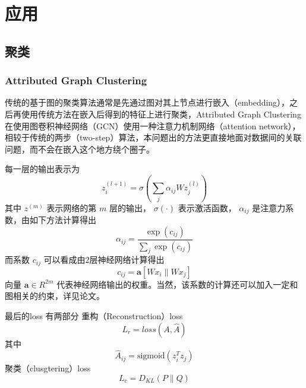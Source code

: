\documentclass[color=gray,base=hide,cn]{elegantbook}
\begin{document}
\part{应用}
\chapter{聚类}
\section{Attributed Graph Clustering}
传统的基于图的聚类算法通常是先通过图对其上节点进行嵌入（embedding），之后再使用传统方法在嵌入后得到的特征上进行聚类，Attributed Graph Clustering\cite{wang2019attributed} 在使用图卷积神经网络（GCN）使用一种注意力机制网络（attention network），相较于传统的两步（two-step）算法，本问题出的方法更直接地面对数据间的关联问题，而不会在嵌入这个地方绕个圈子。

每一层的输出表示为
\begin{equation}
    z^{(l+1)}_i = \sigma(\sum_j \alpha_{ij} W z^{(l)}_j)
\end{equation}
其中 $z^{(m)}$ 表示网络的第 $m$ 层的输出， $\sigma(\cdot)$ 表示激活函数， $\alpha_{ij}$ 是注意力系数，由如下方法计算得出
\begin{equation}
    \alpha_{ij} = \frac{\exp (c_{ij})}{\sum_j \exp (c_{ij})}
\end{equation}
而系数 $c_{ij}$ 可以看成由2层神经网络计算得出
\begin{equation}
    c_{ij} = \mathbf{a} [W x_i\| W x_j]
\end{equation}
向量 $\mathbf{a} \in {R}^{2m}$ 代表神经网络输出的权重。当然，该系数的计算还可以加入一定和图相关的约束，详见论文。


最后的loss 有两部分
重构（Reconstruction）loss
\begin{equation}
    L_r = loss(A, \hat{A})
\end{equation}
其中
\begin{equation}
    \hat{A}_{ij} = \text{sigmoid} (z_i ^T z
_j)
\end{equation}
聚类（clusgtering）loss
\begin{equation}
    L_c = D_{KL}(P\|Q)
\end{equation}

% 

\end{document}
